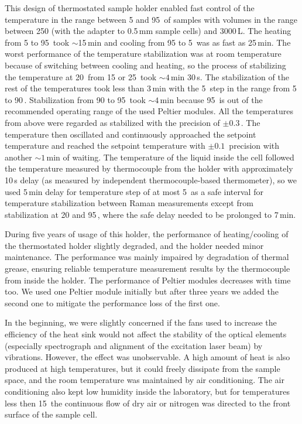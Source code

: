 This design of thermostated sample holder enabled fast control of the
temperature in the range between 5 and 95\,\textcelsius{} of samples with
volumes in the range between 250 (with the adapter to 0.5\,mm sample cells) and
3000\,L.
The heating from 5 to 95\,\textcelsius{} took $\sim$15\,min and cooling from 95
to 5\,\textcelsius{} was as fast as 25\,min.
The worst performance of the temperature stabilization was at room temperature
because of switching between cooling and heating, so the process of
stabilizing the temperature at 20\,\textcelsius{} from 15 or
25\,\textcelsius{} took $\sim 4$\,min 30\,s.
The stabilization of the rest of the temperatures took less than 3\,min with
the 5\,\textcelsius{} step in the range from 5 to 90\,\textcelsius{}.
Stabilization from 90 to 95\,\textcelsius{} took $\sim 4$\,min because
95\,\textcelsius{} is out of the recommended operating range of the used
Peltier modules.
All the temperatures from above were regarded as stabilized with the precision
of $\pm 0.3$\,\textcelsius{}.
The temperature then oscillated and continuously approached the setpoint
temperature and reached the setpoint temperature with $\pm 0.1$\,\textcelsius{}
precision with another $\sim 1$\,min of waiting.
The temperature of the liquid inside the cell followed the temperature measured
by thermocouple from the holder with approximately 10\,s delay (as measured by
independent thermocouple-based thermometer), so we used 5\,min delay for
temperature step of at most 5\,\textcelsius{} as a safe interval for
temperature stabilization between Raman measurements except from stabilization
at 20 and 95\,\textcelsius{}, where the safe delay needed to be prolonged to
7\,min.

During five years of usage of this holder, the performance of heating/cooling
of the thermostated holder slightly degraded, and the holder needed minor
maintenance.
The performance was mainly impaired by degradation of thermal grease, ensuring
reliable temperature measurement results by the thermocouple from inside the
holder.
The performance of Peltier modules decreases with time too.
We used one Peltier module initially but after three years we added the second
one to mitigate the performance loss of the first one.

In the beginning, we were slightly concerned if the fans used to increase the
efficiency of the heat sink would not affect the stability of the optical
elements (especially spectrograph and alignment of the excitation laser beam)
by vibrations.
However, the effect was unobservable.
A high amount of heat is also produced at high temperatures, but it could
freely dissipate from the sample space, and the room temperature was maintained
by air conditioning.
The air conditioning also kept low humidity inside the laboratory, but for
temperatures less then 15\,\textcelsius{} the continuous flow of dry air or
nitrogen was directed to the front surface of the sample cell.
